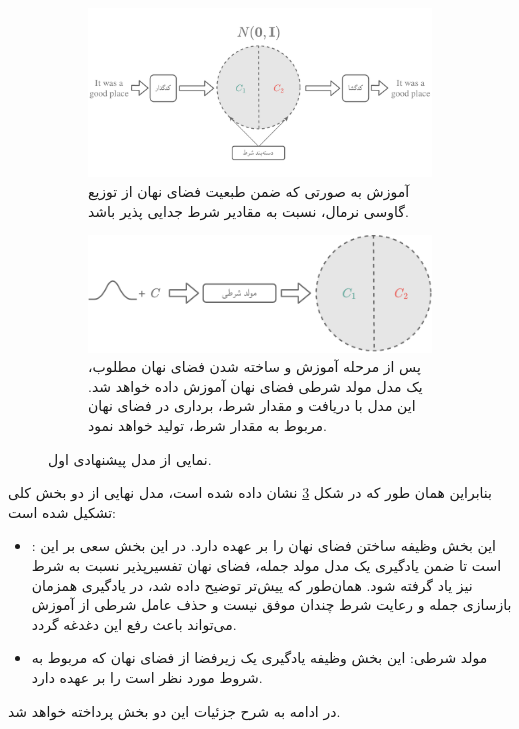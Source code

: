 \begin{figure}[h]
    \centering
    \begin{subfigure}{0.6\textheight}
        \centering
        \includegraphics[width=1.\textwidth]{images/propwae.pdf}
        \caption{
            آموزش \autoencoder{} به صورتی که ضمن طبعیت فضای نهان از توزیع گاوسی نرمال، نسبت به مقادیر شرط جدایی پذیر باشد.
        }
        \label{fig:chap4:propwae}
    \end{subfigure}
    \begin{subfigure}{0.5\textheight}
    \centering
    \includegraphics[width=1.\textwidth]{images/propflow.pdf}
    \caption{
پس از مرحله آموزش \autoencoder{} و ساخته شدن فضای نهان مطلوب، یک مدل مولد شرطی فضای نهان آموزش داده خواهد شد. این مدل با دریافت \noise{} و مقدار شرط، برداری در فضای نهان مربوط به مقدار شرط، تولید خواهد نمود.
    }
    \label{fig:chap4:propflow}
\end{subfigure}
\caption{نمایی از مدل پیشنهادی اول.}
    \label{fig:chap4:prop}
\end{figure}
بنابراین همان طور که در شکل \ref{fig:chap4:prop} نشان داده شده است، مدل نهایی از دو بخش کلی تشکیل شده است:
\begin{itemize}
	\item \autoencoder{}:
	      این بخش وظیفه ساختن فضای نهان را بر عهده دارد. در این بخش سعی بر این است تا ضمن یادگیری یک مدل مولد جمله، فضای نهان تفسیرپذیر نسبت به شرط نیز یاد گرفته شود. همان‌طور که ییش‌تر توضیح داده شد، \vae{} در یادگیری همزمان بازسازی جمله و رعایت شرط چندان موفق نیست و حذف عامل شرطی از آموزش \decoder{} می‌تواند باعث رفع این دغدغه گردد.
	\item
	      مولد شرطی: این بخش وظیفه یادگیری یک زیرفضا از فضای نهان که مربوط به شروط مورد نظر است را بر عهده دارد.
\end{itemize}
در ادامه به شرح جزئیات این دو بخش پرداخته خواهد شد.


